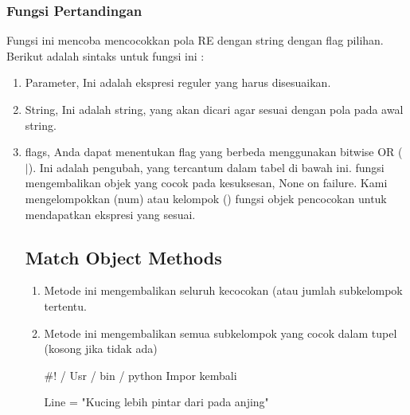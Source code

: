 \subsubsection {Fungsi Pertandingan}
Fungsi ini mencoba mencocokkan pola RE dengan string dengan flag pilihan.
Berikut adalah sintaks untuk fungsi ini :
\begin {enumerate}
\item Parameter, Ini adalah ekspresi reguler yang harus disesuaikan.
\item String, Ini adalah string, yang akan dicari agar sesuai dengan pola pada awal string.
\item flags, Anda dapat menentukan flag yang berbeda menggunakan bitwise OR ( $  \vert  $). Ini adalah pengubah, yang tercantum dalam tabel di bawah ini. fungsi mengembalikan objek yang cocok pada kesuksesan, None on failure. Kami mengelompokkan (num) atau kelompok () fungsi objek pencocokan untuk mendapatkan ekspresi yang sesuai.

\subsection {Match Object Methods}
\begin {enumerate}
\item Metode ini mengembalikan seluruh kecocokan (atau jumlah subkelompok tertentu.
\item Metode ini mengembalikan semua subkelompok yang cocok dalam tupel (kosong jika tidak ada)

 $  \#  $! / Usr / bin / python 
Impor kembali

Line = "Kucing lebih pintar dari pada anjing"
\end {enumerate}


\end{enumerate}
